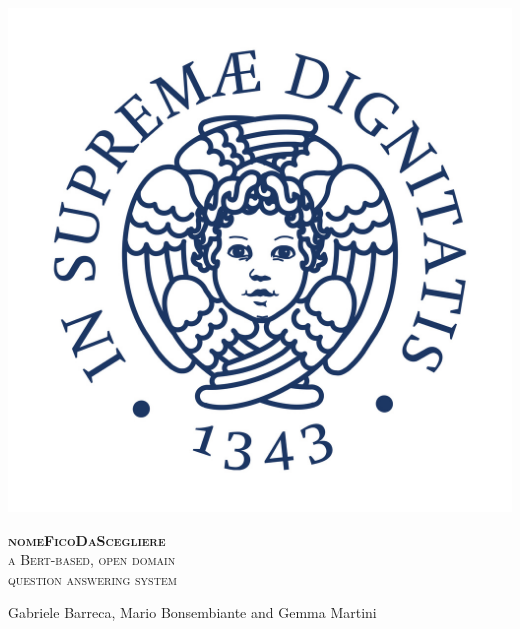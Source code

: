 \documentclass[11pt,hidelinks]{article}
\newcommand{\nomefico}{\textbf{nomeFicoDaScegliere}}
\begin{document}
\begin{titlepage}
    \centering
    \scalebox{0.7} {
        \begin{minipage}{0.22\textwidth}%
            \includegraphics[width=\linewidth]{pics/Cherubino.jpg}
        \end{minipage}\hspace{10pt}
        \begin{minipage}{0.9\textwidth}%
            \flushright
            \large
            \vspace{0.8cm}
            \textsc{\color{pblue}%
            \nomefico\\
            a Bert-based, open domain\\
            question answering system}
        \end{minipage}%
    }

    \vspace{0.3cm}
    
    Gabriele Barreca, Mario Bonsembiante {\small and} Gemma Martini
    
    

\end{titlepage}
\end{document}
